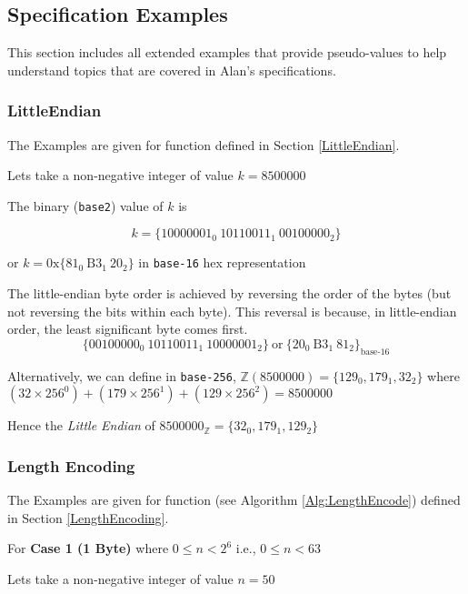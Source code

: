 \documentclass[../alan-handbook.tex]{subfiles}
\begin{document}
\subsection{Specification Examples} \label{Specification Examples}

This section includes all extended examples that provide pseudo-values to help understand topics that are covered in Alan's specifications. 

\subsubsection{LittleEndian} \label{Eg:LittleEndian}

The Examples are given for  function defined in Section \ref{LittleEndian}.

Lets take a non-negative integer of value $k = 8500000$

The binary (\texttt{base2}) value of $k$ is

$$k = \{10000001_0 \ 10110011_1 \ 00100000_2\}$$ 

or $k = \text{0x}\{\text{81}_0 \ \text{B3}_1 \ \text{20}_2\}$ in \texttt{base-16} hex representation

The little-endian byte order is achieved by reversing the order of the bytes (but not reversing the bits within each byte). This reversal is because, in little-endian order, the least significant byte comes first.
$$\{00100000_0 \ 10110011_1 \ 10000001_2\} \ \text{or} \ \{\text{20}_0 \ \text{B3}_1 \ \text{81}_2\}_{\text{base-16}}$$ 

Alternatively, we can define in \texttt{base-256}, $\mathbb{Z}(8500000) = \{129_0,179_1,32_2\}$ where $(32\times 256^0) + (179\times 256^1) + (129 \times 256^2) = 8500000$

Hence the \textit{Little Endian} of $8500000_{\mathbb{Z}} = \{32_0,179_1,129_2\}$

\subsubsection{Length Encoding} \label{Eg:LengthEncoding}

The Examples are given for  function (see Algorithm \ref{Alg:LengthEncode}) defined in Section \ref{LengthEncoding}.

For \textbf{Case 1 (1 Byte)} where $0 \leq n < 2^6$ i.e., $0 \leq n < 63$

Lets take a non-negative integer of value $n=50$
\end{document}
